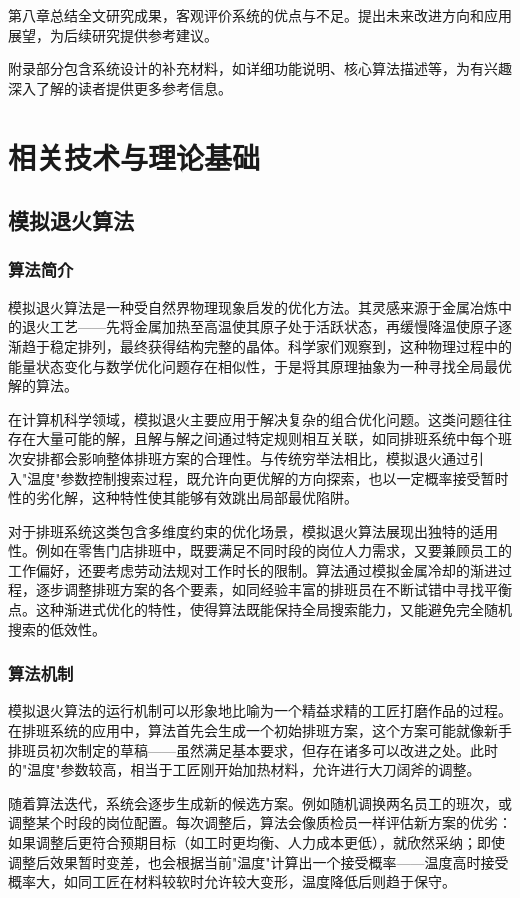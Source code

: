 \documentclass{ctexart}
\begin{document}
第八章总结全文研究成果，客观评价系统的优点与不足。提出未来改进方向和应用展望，为后续研究提供参考建议。

附录部分包含系统设计的补充材料，如详细功能说明、核心算法描述等，为有兴趣深入了解的读者提供更多参考信息。

\section{相关技术与理论基础}
\subsection{模拟退火算法}
\subsubsection{算法简介}
模拟退火算法是一种受自然界物理现象启发的优化方法。其灵感来源于金属冶炼中的退火工艺——先将金属加热至高温使其原子处于活跃状态，再缓慢降温使原子逐渐趋于稳定排列，最终获得结构完整的晶体。科学家们观察到，这种物理过程中的能量状态变化与数学优化问题存在相似性，于是将其原理抽象为一种寻找全局最优解的算法。

在计算机科学领域，模拟退火主要应用于解决复杂的组合优化问题。这类问题往往存在大量可能的解，且解与解之间通过特定规则相互关联，如同排班系统中每个班次安排都会影响整体排班方案的合理性。与传统穷举法相比，模拟退火通过引入"温度"参数控制搜索过程，既允许向更优解的方向探索，也以一定概率接受暂时性的劣化解，这种特性使其能够有效跳出局部最优陷阱。

对于排班系统这类包含多维度约束的优化场景，模拟退火算法展现出独特的适用性。例如在零售门店排班中，既要满足不同时段的岗位人力需求，又要兼顾员工的工作偏好，还要考虑劳动法规对工作时长的限制。算法通过模拟金属冷却的渐进过程，逐步调整排班方案的各个要素，如同经验丰富的排班员在不断试错中寻找平衡点。这种渐进式优化的特性，使得算法既能保持全局搜索能力，又能避免完全随机搜索的低效性。

\subsubsection{算法机制}
模拟退火算法的运行机制可以形象地比喻为一个精益求精的工匠打磨作品的过程。在排班系统的应用中，算法首先会生成一个初始排班方案，这个方案可能就像新手排班员初次制定的草稿——虽然满足基本要求，但存在诸多可以改进之处。此时的"温度"参数较高，相当于工匠刚开始加热材料，允许进行大刀阔斧的调整。

随着算法迭代，系统会逐步生成新的候选方案。例如随机调换两名员工的班次，或调整某个时段的岗位配置。每次调整后，算法会像质检员一样评估新方案的优劣：如果调整后更符合预期目标（如工时更均衡、人力成本更低），就欣然采纳；即使调整后效果暂时变差，也会根据当前"温度"计算出一个接受概率——温度高时接受概率大，如同工匠在材料较软时允许较大变形，温度降低后则趋于保守。
\end{document}
